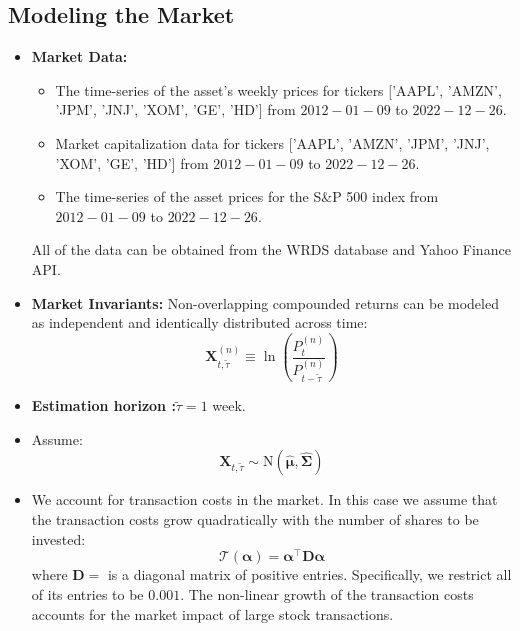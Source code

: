 \documentclass[13pt]{article}
\theoremstyle{definition}
\theoremstyle{remark}
\newenvironment{remark}
  {\pushQED{\qed}\renewcommand{\qedsymbol}{$\triangle$}\remarkx}
  {\popQED\endremarkx}
\begin{document}
\subsection{Modeling the Market}
\begin{itemize}
    \item \textbf{Market Data:}
    \begin{itemize}
    \item The time-series of the asset's weekly prices for tickers ['AAPL', 'AMZN', 'JPM', 'JNJ', 'XOM', 'GE', 'HD'] from $2012-01-09$ to $2022-12-26$.
    \item Market capitalization data for tickers ['AAPL', 'AMZN', 'JPM', 'JNJ', 'XOM', 'GE', 'HD'] from $2012-01-09$ to $2022-12-26$.
    \item The time-series of the asset prices for the S\&P 500 index from $2012-01-09$ to $2022-12-26$.
\end{itemize}
All of the data can be obtained from the WRDS database and Yahoo Finance API.
    \item \textbf{Market Invariants:} Non-overlapping compounded returns can be modeled as independent and identically distributed across time:
$$
\mathbf{X}_{t, \widetilde{\tau}}^{(n)} \equiv \ln \left(\frac{P_t^{(n)}}{P_{t-\widetilde{\tau}}^{(n)}}\right)
$$
    \item \textbf{Estimation horizon :}$\widetilde{\tau}=1$ week.
    \item Assume: $$
\mathbf{X}_{t, \tilde{\tau}} \sim \mathrm{N}\left(\widehat{\boldsymbol{\mu}}, \widehat{\boldsymbol{\Sigma}}\right)
$$
\item We account for transaction costs in the market. In this case we assume that the transaction costs grow quadratically with the number of shares to be invested:
$$
\mathcal{T}(\boldsymbol{\alpha})=\boldsymbol{\alpha}^{\top} \mathbf{D}\boldsymbol{\alpha}
$$
where $\mathbf{D}=$ is a diagonal matrix of positive entries. Specifically, we restrict all of its entries to be $0.001$. 
\begin{remark}
    The non-linear growth of the transaction costs accounts for the market impact of large stock transactions.
\end{remark}
\end{itemize}
\end{document}
